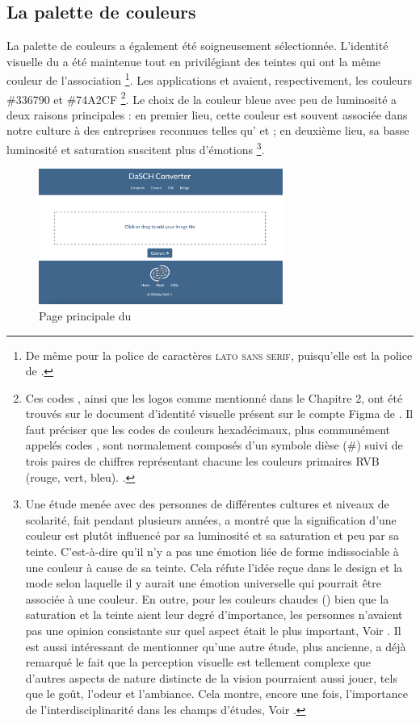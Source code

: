         \subsection{La palette de couleurs}
        La palette de couleurs a également été soigneusement sélectionnée. L'identité visuelle du \dsc a été maintenue tout en privilégiant des teintes qui ont la même couleur de l'association \footnote{De même pour la police de caractères \textsc{lato} \textsc{sans serif}, puisqu'elle est la police de \dsc.}. Les applications \cvt et \msh avaient, respectivement, les  couleurs \#336790 et \#74A2CF \footnote{Ces codes , ainsi que les logos comme mentionné dans le Chapitre 2, ont été trouvés sur le document d'identité visuelle présent sur le compte Figma de \dsc. Il faut préciser que les codes de couleurs hexadécimaux, plus communément appelés codes , sont normalement composés d'un symbole dièse (\#) suivi de trois paires de chiffres représentant chacune les couleurs primaires RVB (rouge, vert, bleu). \cite{adobe_hex_codes}.}. Le choix de la couleur bleue avec peu de luminosité a deux raisons principales : en premier lieu, cette couleur est souvent associée dans notre culture à des entreprises reconnues telles qu' et  ; en deuxième lieu, sa basse luminosité et saturation suscitent plus d'émotions \footnote {Une étude menée avec des personnes de différentes cultures et niveaux de scolarité, fait pendant plusieurs années, a montré que la signification d'une couleur est plutôt influencé par sa luminosité et sa saturation et peu par sa teinte. C'est-à-dire qu'il n'y a pas une émotion liée de forme indissociable à une couleur à cause de sa teinte. Cela réfute l'idée reçue dans le design et la mode selon laquelle il y aurait une émotion universelle qui pourrait être associée à une couleur. En outre, pour les couleurs chaudes () bien que la saturation et la teinte aient leur degré d'importance, les personnes n'avaient pas une opinion consistante sur quel aspect était le plus important, Voir \cite{crosscultemo}. Il est aussi intéressant de mentionner qu'une autre étude, plus ancienne, a déjà remarqué le fait que la perception visuelle est tellement complexe que d'autres aspects de nature distincte de la vision pourraient aussi jouer, tels que le goût, l'odeur et l'ambiance. Cela montre, encore une fois, l'importance de l'interdisciplinarité dans les champs d'études, Voir \cite{valberg2005}.}.

        \begin{figure}[h!]
            \centering
            \includegraphics[width=8cm]{02_images/part_02/01_app_dasch_conv.png}
            \caption{Page principale du \cvt}
        \end{figure}

